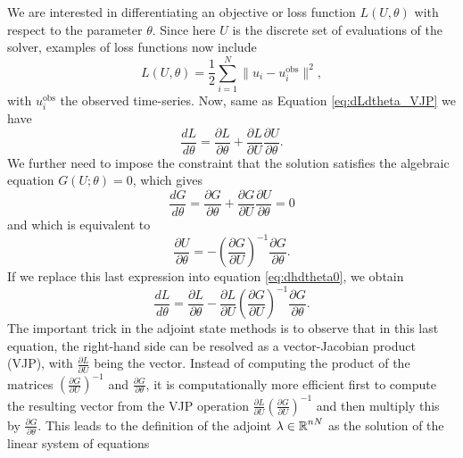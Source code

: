 We are interested in differentiating an objective or loss function $L(U, \theta)$ with respect to the parameter $\theta$. 
Since here $U$ is the discrete set of evaluations of the solver, examples of loss functions now include 
\begin{equation}
    L(U, \theta) 
    = 
    \frac{1}{2} \sum_{i=1}^N \| u_i - u_i^\text{obs} \|^2, 
\end{equation}
with $u_i^\text{obs}$ the observed time-series. 
Now, same as Equation \eqref{eq:dLdtheta_VJP} we have 
\begin{equation}
    \frac{dL}{d\theta} 
    = 
    \frac{\partial L}{\partial \theta} 
    + 
    \frac{\partial L}{\partial U} \frac{\partial U}{\partial \theta}.
    \label{eq:dhdtheta0}
\end{equation}
We further need to impose the constraint that the solution satisfies the algebraic equation $G(U; \theta) = 0$, which gives
\begin{equation}
    \frac{dG}{d\theta} 
    = 
    \frac{\partial G}{\partial \theta} 
    + 
    \frac{\partial G}{\partial U} \frac{\partial U}{\partial \theta}
    =
    0
\end{equation}
and which is equivalent to 
\begin{equation}
    \frac{\partial U}{\partial \theta} 
    = 
    - \left( \frac{\partial G}{\partial U} \right)^{-1} \frac{\partial G}{\partial \theta}.
\end{equation}
If we replace this last expression into equation \eqref{eq:dhdtheta0}, we obtain
\begin{equation}
    \frac{dL}{d\theta} 
    =
    \frac{\partial L}{\partial \theta} 
    - 
    \frac{\partial L}{\partial U}
    \left( \frac{\partial G}{\partial U} \right)^{-1} 
    \frac{\partial G}{\partial \theta}.
    \label{eq:dhdtheta}
\end{equation}
The important trick in the adjoint state methods is to observe that in this last equation, the right-hand side can be resolved as a vector-Jacobian product (VJP), with $\frac{\partial L}{\partial U}$ being the vector.
Instead of computing the product of the matrices $\left( \frac{\partial G}{\partial U} \right)^{-1}$ and $\frac{\partial G}{\partial \theta}$, it is computationally more efficient first to compute the resulting vector from the VJP operation $\frac{\partial L}{\partial U} \left( \frac{\partial G}{\partial U} \right)^{-1}$ and then multiply this by $\frac{\partial G}{\partial \theta}$.
This leads to the definition of the adjoint $\lambda \in \operatorname{\mathbb{R}}^{nN}$ as the solution of the linear system of equations 
